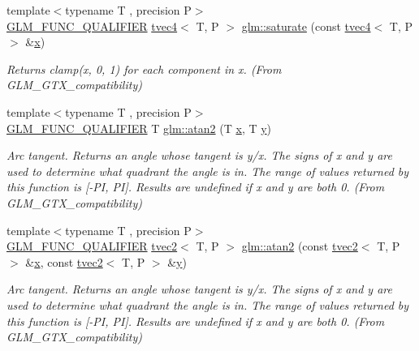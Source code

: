 \begin{DoxyCompactItemize}
{\footnotesize template$<$typename T , precision P$>$ }\\\mbox{\hyperlink{setup_8hpp_a33fdea6f91c5f834105f7415e2a64407}{G\+L\+M\+\_\+\+F\+U\+N\+C\+\_\+\+Q\+U\+A\+L\+I\+F\+I\+ER}} \mbox{\hyperlink{structglm_1_1tvec4}{tvec4}}$<$ T, P $>$ \mbox{\hyperlink{group__gtx__compatibility_ga63791409bdef9745b956406afe3157f1}{glm\+::saturate}} (const \mbox{\hyperlink{structglm_1_1tvec4}{tvec4}}$<$ T, P $>$ \&\mbox{\hyperlink{glad_8h_a92d0386e5c19fb81ea88c9f99644ab1d}{x}})
\begin{DoxyCompactList}\small\item\em Returns clamp(x, 0, 1) for each component in x. (From G\+L\+M\+\_\+\+G\+T\+X\+\_\+compatibility) \end{DoxyCompactList}\item 
{\footnotesize template$<$typename T , precision P$>$ }\\\mbox{\hyperlink{setup_8hpp_a33fdea6f91c5f834105f7415e2a64407}{G\+L\+M\+\_\+\+F\+U\+N\+C\+\_\+\+Q\+U\+A\+L\+I\+F\+I\+ER}} T \mbox{\hyperlink{group__gtx__compatibility_gac63011205bf6d0be82589dc56dd26708}{glm\+::atan2}} (T \mbox{\hyperlink{glad_8h_a92d0386e5c19fb81ea88c9f99644ab1d}{x}}, T \mbox{\hyperlink{glad_8h_a66ddd433d2cacfe27f5906b7e86faeed}{y}})
\begin{DoxyCompactList}\small\item\em Arc tangent. Returns an angle whose tangent is y/x. The signs of x and y are used to determine what quadrant the angle is in. The range of values returned by this function is \mbox{[}-\/PI, PI\mbox{]}. Results are undefined if x and y are both 0. (From G\+L\+M\+\_\+\+G\+T\+X\+\_\+compatibility) \end{DoxyCompactList}\item 
{\footnotesize template$<$typename T , precision P$>$ }\\\mbox{\hyperlink{setup_8hpp_a33fdea6f91c5f834105f7415e2a64407}{G\+L\+M\+\_\+\+F\+U\+N\+C\+\_\+\+Q\+U\+A\+L\+I\+F\+I\+ER}} \mbox{\hyperlink{structglm_1_1tvec2}{tvec2}}$<$ T, P $>$ \mbox{\hyperlink{group__gtx__compatibility_ga525f3e849d0fc64807f8ab571b4545f9}{glm\+::atan2}} (const \mbox{\hyperlink{structglm_1_1tvec2}{tvec2}}$<$ T, P $>$ \&\mbox{\hyperlink{glad_8h_a92d0386e5c19fb81ea88c9f99644ab1d}{x}}, const \mbox{\hyperlink{structglm_1_1tvec2}{tvec2}}$<$ T, P $>$ \&\mbox{\hyperlink{glad_8h_a66ddd433d2cacfe27f5906b7e86faeed}{y}})
\begin{DoxyCompactList}\small\item\em Arc tangent. Returns an angle whose tangent is y/x. The signs of x and y are used to determine what quadrant the angle is in. The range of values returned by this function is \mbox{[}-\/PI, PI\mbox{]}. Results are undefined if x and y are both 0. (From G\+L\+M\+\_\+\+G\+T\+X\+\_\+compatibility) \end{DoxyCompactList}\item 

\end{DoxyCompactItemize}
